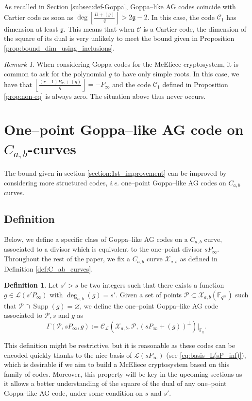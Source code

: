 \documentclass[a4paper]{article}
\theoremstyle{definition}
\newtheorem{definition}[thm]{Definition}
\theoremstyle{remark}
\newtheorem{remark}[thm]{Remark}
\newcommand{\calP}{\mathcal{P}}
\newcommand{\calL}{\mathcal{L}}
\newcommand{\calC}{\mathcal{C}}
\newcommand{\calX}{\mathcal{X}}
\newcommand{\fq}{\mathbb{F}_{q}}
\newcommand{\F}{\mathbb{F}}
\newcommand{\Supp}{\operatorname{Supp}}
\newcommand{\degab}[1]{\deg_{a,b}\left(#1\right)}
\begin{document}
As recalled in Section \ref{subsec:def-Goppa}, Goppa--like AG codes coincide with Cartier code as soon as $\deg \left\lfloor \frac{D+(g)}{q} \right\rfloor > 2 \mathfrak{g}-2$. In this case, the code $\calC_1$ has dimension at least $\mathfrak{g}$. This means that when $\calC$ is a Cartier code, the dimension of the square of its dual is very unlikely to meet the bound given in Proposition \ref{prop:bound_dim_using_inclusions}.

\begin{remark}
	When considering Goppa codes for the McEliece cryptosystem, it is common to ask for the polynomial $g$ to have only simple roots. In this case, we have that $ \left\lfloor \frac{(r-1)P_\infty+(g)}{q} \right\rfloor = -P_\infty$ and the code $\calC_1$ defined in Proposition \ref{prop:non-eq} is always zero. The situation above thus never occurs.
\end{remark}

\section{One--point Goppa--like AG code on $C_{a,b}$-curves}\label{sec:AG-C_a,b}
The bound given in section \ref{section:1st_improvement} can be improved by considering more structured codes, \emph{i.e.} one--point Goppa--like AG codes on $C_{a,b}$ curves.
\subsection{Definition}

Below, we define a specific class of Goppa--like AG codes on a $C_{a,b}$ curve, associated to a divisor which is equivalent to the one--point divisor $sP_\infty$. 
\noindent Throughout the rest of the paper, we fix a $C_{a,b}$ curve $\calX_{a,b}$ as defined in Definition \ref{def:C_ab_curves}.
\begin{definition} \label{def:one--point_Goppa--like_AG_codes_on_C_a,b_curves}
Let $s'>s$ be two integers such that there exists a function $g \in \calL(s'P_\infty)$ with $\degab{g}=s'$. Given a set of points  $\calP \subset \calX_{a,b}(\F_{q^m})$ such that $\calP \cap \Supp(g) = \varnothing$, we define the one--point Goppa--like AG code associated to $\calP,s$ and $g$ as 
\[\Gamma(\calP,sP_\infty,g) := \calC_{\calL}(\calX_{a,b},\calP,(sP_\infty+(g))^{\perp})|_{\fq}.\]
\end{definition}
This definition might be restrictive, but it is reasonable as these codes can be encoded quickly thanks to the nice basis of $\calL(sP_\infty)$ (see \eqref{eq:basis_L(sP_inf)}), which is desirable if we aim to build a McEliece cryptosystem based on this family of codes. Moreover, this property will be key in the upcoming sections as it allows a better understanding of the square of the dual of any one--point Goppa--like AG code, under some condition on $s$ and $s'$. \\
\end{document}
